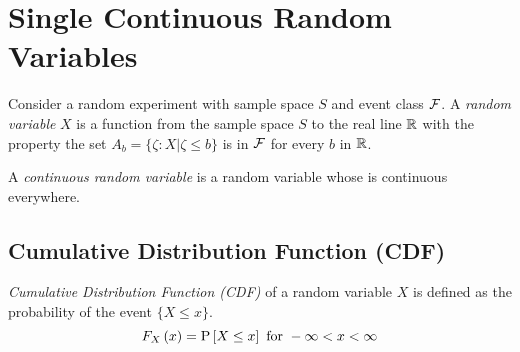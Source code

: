 \section{Single Continuous Random Variables} \label{sec:Single Continuous Random Variables}
	\begin{definition} \label{def:Random Variable, Full}
		Consider a random experiment with sample space $S$ and event class $\operatorname{\mathcal{F}}$.
		A \emph{random variable} $X$ is a function from the sample space $S$ to the real line $\operatorname{\mathbb{R}}$ with the property the set $A_{b} = \lbrace \zeta: X \vert \zeta \leq b \rbrace$ is in $\operatorname{\mathcal{F}}$ for every $b$ in $\operatorname{\mathbb{R}}$.
	\end{definition}
	\begin{definition} \label{def:Continuous Random Variable}
		A \emph{continuous random variable} is a random variable whose  is continuous everywhere.
	\end{definition}

	\subsection{Cumulative Distribution Function (CDF)} \label{subsec:Cumulative Distribution Function}
		\begin{definition} \label{def:Cumulative Distribution Function}
			\emph{Cumulative Distribution Function (CDF)} of a random variable $X$ is defined as the probability of the event $\lbrace X \leq x \rbrace$.
			\begin{equation} \label{eq:Cumulative Distribution Function}
				F_{X} \left( x \right) = \operatorname{\operatorname{P}} \left[ X \leq x \right] \text{ for } -\infty < x < \infty
			\end{equation}
		\end{definition}
	
